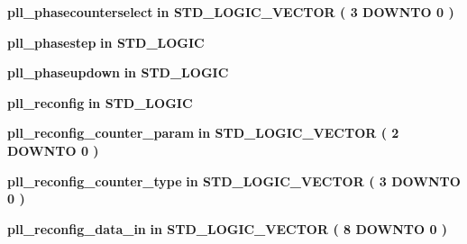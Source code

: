 \begin{DoxyCompactItemize}
\item 
{\bf pll\+\_\+phasecounterselect}  {\bfseries {\bfseries \textcolor{keywordflow}{in}\textcolor{vhdlchar}{ }}} {\bfseries \textcolor{comment}{S\+T\+D\+\_\+\+L\+O\+G\+I\+C\+\_\+\+V\+E\+C\+T\+OR}\textcolor{vhdlchar}{ }\textcolor{vhdlchar}{(}\textcolor{vhdlchar}{ }\textcolor{vhdlchar}{ } \textcolor{vhdldigit}{3} \textcolor{vhdlchar}{ }\textcolor{keywordflow}{D\+O\+W\+N\+TO}\textcolor{vhdlchar}{ }\textcolor{vhdlchar}{ } \textcolor{vhdldigit}{0} \textcolor{vhdlchar}{ }\textcolor{vhdlchar}{)}\textcolor{vhdlchar}{ }} 
\item 
{\bf pll\+\_\+phasestep}  {\bfseries {\bfseries \textcolor{keywordflow}{in}\textcolor{vhdlchar}{ }}} {\bfseries \textcolor{comment}{S\+T\+D\+\_\+\+L\+O\+G\+IC}\textcolor{vhdlchar}{ }} 
\item 
{\bf pll\+\_\+phaseupdown}  {\bfseries {\bfseries \textcolor{keywordflow}{in}\textcolor{vhdlchar}{ }}} {\bfseries \textcolor{comment}{S\+T\+D\+\_\+\+L\+O\+G\+IC}\textcolor{vhdlchar}{ }} 
\item 
{\bf pll\+\_\+reconfig}  {\bfseries {\bfseries \textcolor{keywordflow}{in}\textcolor{vhdlchar}{ }}} {\bfseries \textcolor{comment}{S\+T\+D\+\_\+\+L\+O\+G\+IC}\textcolor{vhdlchar}{ }} 
\item 
{\bf pll\+\_\+reconfig\+\_\+counter\+\_\+param}  {\bfseries {\bfseries \textcolor{keywordflow}{in}\textcolor{vhdlchar}{ }}} {\bfseries \textcolor{comment}{S\+T\+D\+\_\+\+L\+O\+G\+I\+C\+\_\+\+V\+E\+C\+T\+OR}\textcolor{vhdlchar}{ }\textcolor{vhdlchar}{(}\textcolor{vhdlchar}{ }\textcolor{vhdlchar}{ } \textcolor{vhdldigit}{2} \textcolor{vhdlchar}{ }\textcolor{keywordflow}{D\+O\+W\+N\+TO}\textcolor{vhdlchar}{ }\textcolor{vhdlchar}{ } \textcolor{vhdldigit}{0} \textcolor{vhdlchar}{ }\textcolor{vhdlchar}{)}\textcolor{vhdlchar}{ }} 
\item 
{\bf pll\+\_\+reconfig\+\_\+counter\+\_\+type}  {\bfseries {\bfseries \textcolor{keywordflow}{in}\textcolor{vhdlchar}{ }}} {\bfseries \textcolor{comment}{S\+T\+D\+\_\+\+L\+O\+G\+I\+C\+\_\+\+V\+E\+C\+T\+OR}\textcolor{vhdlchar}{ }\textcolor{vhdlchar}{(}\textcolor{vhdlchar}{ }\textcolor{vhdlchar}{ } \textcolor{vhdldigit}{3} \textcolor{vhdlchar}{ }\textcolor{keywordflow}{D\+O\+W\+N\+TO}\textcolor{vhdlchar}{ }\textcolor{vhdlchar}{ } \textcolor{vhdldigit}{0} \textcolor{vhdlchar}{ }\textcolor{vhdlchar}{)}\textcolor{vhdlchar}{ }} 
\item 
{\bf pll\+\_\+reconfig\+\_\+data\+\_\+in}  {\bfseries {\bfseries \textcolor{keywordflow}{in}\textcolor{vhdlchar}{ }}} {\bfseries \textcolor{comment}{S\+T\+D\+\_\+\+L\+O\+G\+I\+C\+\_\+\+V\+E\+C\+T\+OR}\textcolor{vhdlchar}{ }\textcolor{vhdlchar}{(}\textcolor{vhdlchar}{ }\textcolor{vhdlchar}{ } \textcolor{vhdldigit}{8} \textcolor{vhdlchar}{ }\textcolor{keywordflow}{D\+O\+W\+N\+TO}\textcolor{vhdlchar}{ }\textcolor{vhdlchar}{ } \textcolor{vhdldigit}{0} \textcolor{vhdlchar}{ }\textcolor{vhdlchar}{)}\textcolor{vhdlchar}{ }} 

\end{DoxyCompactItemize}
